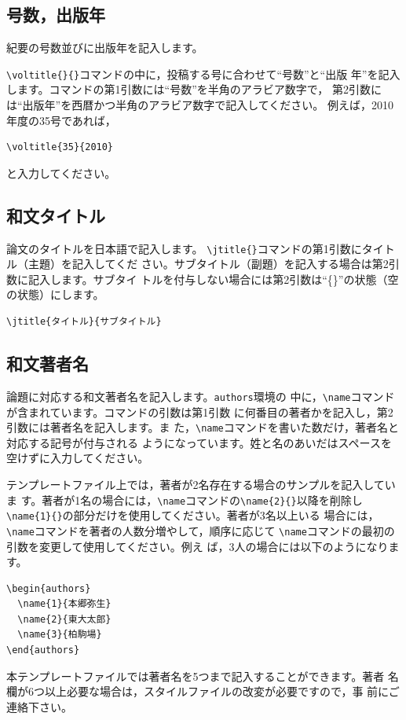 \documentclass[b5paper,10pt,twocolumn,tombow]{jarticle}
\begin{document}
\subsection{号数，出版年}
紀要の号数並びに出版年を記入します。

\verb|\voltitle{}{}|コマンドの中に，投稿する号に合わせて``号数''と``出版
年''を記入します。コマンドの第1引数には``号数''を半角のアラビア数字で，
第2引数には``出版年''を西暦かつ半角のアラビア数字で記入してください。
例えば，2010年度の35号であれば，
\begin{verbatim}
\voltitle{35}{2010}
\end{verbatim}
と入力してください。

\subsection{和文タイトル}
論文のタイトルを日本語で記入します。
\verb|\jtitle{}|コマンドの第1引数にタイトル（主題）を記入してくだ
さい。サブタイトル（副題）を記入する場合は第2引数に記入します。サブタイ
トルを付与しない場合には第2引数は``\{\}''の状態（空の状態）にします。
\begin{verbatim}
\jtitle{タイトル}{サブタイトル}
\end{verbatim}

\subsection{和文著者名}
論題に対応する和文著者名を記入します。\texttt{authors}環境の
中に，\verb|\name|コマンドが含まれています。コマンドの引数は第1引数
に何番目の著者かを記入し，第2引数には著者名を記入します。ま
た，\verb|\name|コマンドを書いた数だけ，著者名と対応する記号が付与される
ようになっています。姓と名のあいだはスペースを空けずに入力してください。

テンプレートファイル上では，著者が2名存在する場合のサンプルを記入していま
す。著者が1名の場合には，\verb|\name|コマンドの\verb|\name{2}{}|以降を削除し
\verb|\name{1}{}|の部分だけを使用してください。著者が3名以上いる
場合には，\verb|\name|コマンドを著者の人数分増やして，順序に応じて
\verb|\name|コマンドの最初の引数を変更して使用してください。例え
ば，3人の場合には以下のようになります。
\begin{verbatim}
\begin{authors}
  \name{1}{本郷弥生}
  \name{2}{東大太郎}
  \name{3}{柏駒場}
\end{authors}
\end{verbatim}
本テンプレートファイルでは著者名を5つまで記入することができます。著者
名欄が6つ以上必要な場合は，スタイルファイルの改変が必要ですので，事
前にご連絡下さい。
\end{document}
